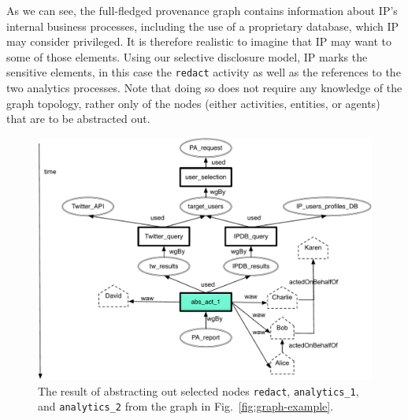 As we can see, the full-fledged provenance graph contains information about IP's internal business processes, including the use of a proprietary database, which IP may consider privileged.
It is therefore realistic to imagine that IP may want to  some of those elements. 
Using our selective disclosure model, IP marks the sensitive elements, in this case the \texttt{redact} activity as well as the references to the two analytics processes. Note that doing so does not require any knowledge of the graph topology, rather only of the nodes (either activities, entities, or agents) that are to be abstracted out.


	\begin{figure}
		\begin{center}
\includegraphics[width=.9\textwidth]{analytics-ex-abs1-FGCS-paper}
			\caption{The result of abstracting out selected nodes \texttt{redact},  \texttt{analytics\_1}, and  \texttt{analytics\_2}  from the graph in Fig.~\ref{fig:graph-example}.} 
			\label{fig:graph-example-abs-1}
		\end{center}
	\end{figure}	
	
